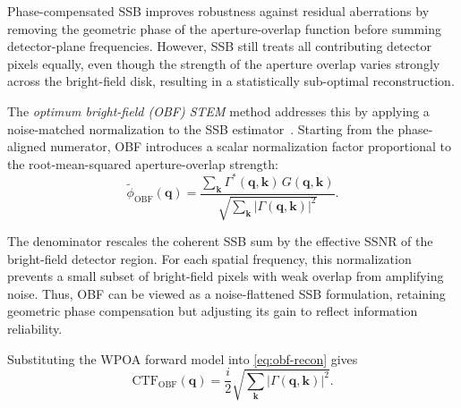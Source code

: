 \documentclass[pdflatex,sn-aps,iicol]{sn-jnl}%
\begin{document}
Phase-compensated SSB improves robustness against residual aberrations by removing the geometric phase of the aperture-overlap function before summing detector-plane frequencies.
However, SSB still treats all contributing detector pixels equally, even though the strength of the aperture overlap varies strongly across the bright-field disk, resulting in a statistically sub-optimal reconstruction.

The \emph{optimum bright-field (OBF) STEM} method addresses this by applying a noise-matched normalization to the SSB estimator~\cite{Ooe_2021,Ooe_2024}.
Starting from the phase-aligned numerator, OBF introduces a scalar normalization factor proportional to the root-mean-squared aperture-overlap strength:
\begin{equation}
  \tilde{\phi}_{\text{OBF}}(\boldsymbol{q}) = \frac{\sum_{\boldsymbol{k}} \Gamma^{*}(\boldsymbol{q},\boldsymbol{k})\,G(\boldsymbol{q},\boldsymbol{k})} {\sqrt{\sum_{\boldsymbol{k}}\lvert \Gamma(\boldsymbol{q},\boldsymbol{k}) \rvert^2}} .
  \label{eq:obf-recon}
\end{equation}

The denominator rescales the coherent SSB sum by the effective SSNR of the bright-field detector region.
For each spatial frequency, this normalization prevents a small subset of bright-field pixels with weak overlap from amplifying noise.
Thus, OBF can be viewed as a noise-flattened SSB formulation, retaining geometric phase compensation but adjusting its gain to reflect information reliability.

Substituting the WPOA forward model into \cref{eq:obf-recon} gives
\begin{equation}
  \mathrm{CTF}_{\text{OBF}}(\boldsymbol{q}) = \frac{i}{2} \sqrt{\sum_{\boldsymbol{k}}\lvert \Gamma(\boldsymbol{q},\boldsymbol{k}) \rvert^2}.
  \label{eq:obf-ctf}
\end{equation}
\end{document}
